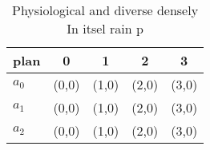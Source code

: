 \documentclass[a4paper]{article}
\begin{document}
\begin{table}
\begin{adjustbox}{width=0.5\columnwidth}
\begin{tabular}{|l|l|l|l|l|}
\hline
\textbf{plan} & \multicolumn{1}{c|}{\textbf{0}} & \multicolumn{1}{c|}{\textbf{1}} & \multicolumn{1}{c|}{\textbf{2}} & \multicolumn{1}{c|}{\textbf{3}} \\ \hline
\textbf{$a_0$}  & (0,0) & (1,0) & (2,0) & (3,0) \\ \hline
\textbf{$a_1$}  & (0,0) & (1,0) & (2,0) & (3,0) \\ \hline
\textbf{$a_2$}  & (0,0) & (1,0) & (2,0) & (3,0) \\ \hline
\end{tabular}
\end{adjustbox}
\caption{Physiological and diverse densely In itsel rain p
}
\end{table}
\end{document}
